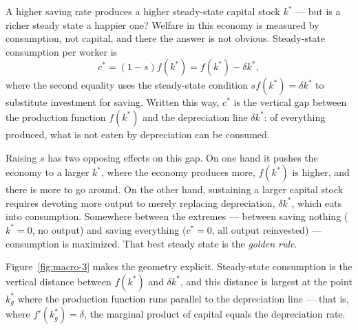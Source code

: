 A higher saving rate produces a higher steady-state capital stock $k^*$ --- but is a richer steady state a happier one? Welfare in this economy is measured by consumption, not capital, and there the answer is not obvious. Steady-state consumption per worker is
\[
c^* = (1-s) f(k^*) = f(k^*) - \delta k^*,
\]
where the second equality uses the steady-state condition $s f(k^*) = \delta k^*$ to substitute investment for saving. Written this way, $c^*$ is the vertical gap between the production function $f(k^*)$ and the depreciation line $\delta k^*$: of everything produced, what is not eaten by depreciation can be consumed.

Raising $s$ has two opposing effects on this gap. On one hand it pushes the economy to a larger $k^*$, where the economy produces more, $f(k^*)$ is higher, and there is more to go around. On the other hand, sustaining a larger capital stock requires devoting more output to merely replacing depreciation, $\delta k^*$, which eats into consumption. Somewhere between the extremes --- between saving nothing ($k^* = 0$, no output) and saving everything ($c^* = 0$, all output reinvested) --- consumption is maximized. That best steady state is the \emph{golden rule}.



Figure~\ref{fig:macro-3} makes the geometry explicit. Steady-state consumption is the vertical distance between $f(k^*)$ and $\delta k^*$, and this distance is largest at the point $k_g^*$ where the production function runs parallel to the depreciation line --- that is, where $f'(k_g^*) = \delta$, the marginal product of capital equals the depreciation rate.

